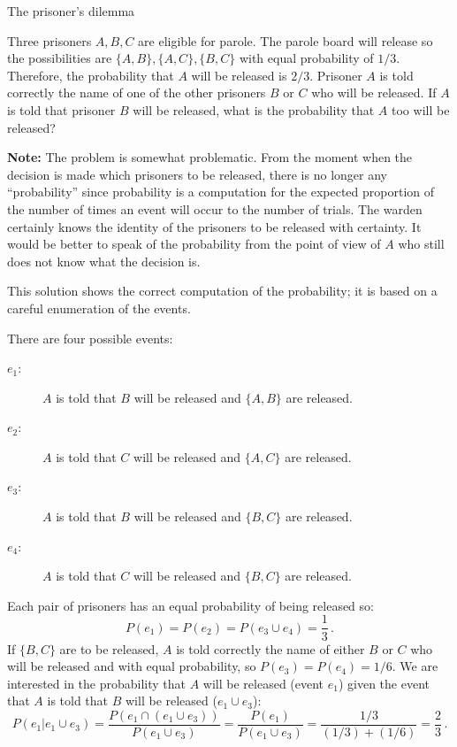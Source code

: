 \begin{prob}{The prisoner's dilemma}

Three prisoners $A,B,C$ are eligible for parole. The parole board will release so the possibilities are $\{A,B\}, \{A,C\}, \{B,C\}$ with equal probability of $1/3$. Therefore, the probability that $A$ will be released is $2/3$. Prisoner $A$ is told correctly the name of  one of the other prisoners $B$ or $C$ who will be released. If $A$ is told that prisoner $B$ will be released, what is the probability that $A$ too will be released?

\textbf{Note:} The problem is somewhat problematic. From the moment when the decision is made which prisoners to be released, there is no longer any ``probability'' since probability is a computation for the expected proportion of the number of times an event will occur to the number of trials. The warden certainly knows the identity of the prisoners to be released with certainty. It would be better to speak of the probability from the point of view of $A$ who still does not know what the decision is.
\end{prob}


This solution shows the correct computation of the probability; it is based on a careful enumeration of the events.

There are four possible events:
\begin{description}
\item[$e_1$:] $A$ is told that $B$ will be released and $\{A,B\}$ are released. 
\item[$e_2$:] $A$ is told that $C$ will be released and $\{A,C\}$ are released. 
\item[$e_3$:] $A$ is told that $B$ will be released and $\{B,C\}$ are released. 
\item[$e_4$:] $A$ is told that $C$ will be released and $\{B,C\}$ are released. 
\end{description}
Each pair of prisoners has an equal probability of being released so:
\[
P(e_1)=P(e_2)=P(e_3\cup e_4)=\frac{1}{3}\,.
\]
If $\{B,C\}$ are to be released, $A$ is told correctly the name of either $B$ or $C$ who will be released and with equal probability, so $P(e_3)=P(e_4)=1/6$. We are interested in the probability that $A$ will be released (event $e_1$) given the event that $A$ is told that $B$ will be released ($e_1\cup e_3$):
\[
P(e_1|e_1\cup e_3) = \frac{P(e_1\cap(e_1\cup e_3))}{P(e_1\cup e_3)}=\frac{P(e_1)}{P(e_1\cup e_3)}=\frac{1/3}{(1/3)+(1/6)}=\frac{2}{3}\,.
\]

